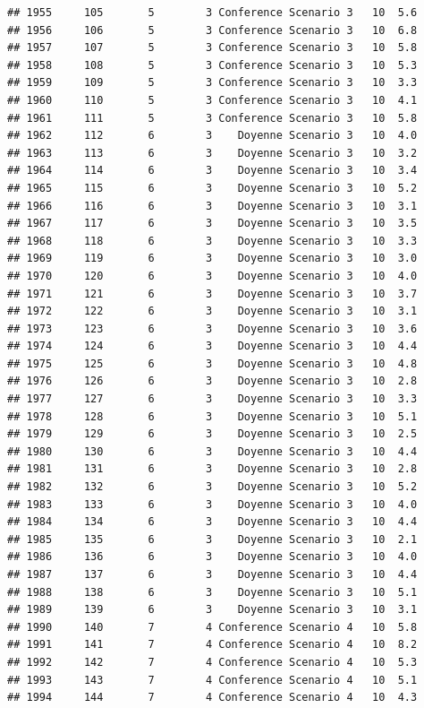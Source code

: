 \documentclass[
]{article}
\begin{document}
\begin{verbatim}
## 1955     105       5        3 Conference Scenario 3   10  5.6
## 1956     106       5        3 Conference Scenario 3   10  6.8
## 1957     107       5        3 Conference Scenario 3   10  5.8
## 1958     108       5        3 Conference Scenario 3   10  5.3
## 1959     109       5        3 Conference Scenario 3   10  3.3
## 1960     110       5        3 Conference Scenario 3   10  4.1
## 1961     111       5        3 Conference Scenario 3   10  5.8
## 1962     112       6        3    Doyenne Scenario 3   10  4.0
## 1963     113       6        3    Doyenne Scenario 3   10  3.2
## 1964     114       6        3    Doyenne Scenario 3   10  3.4
## 1965     115       6        3    Doyenne Scenario 3   10  5.2
## 1966     116       6        3    Doyenne Scenario 3   10  3.1
## 1967     117       6        3    Doyenne Scenario 3   10  3.5
## 1968     118       6        3    Doyenne Scenario 3   10  3.3
## 1969     119       6        3    Doyenne Scenario 3   10  3.0
## 1970     120       6        3    Doyenne Scenario 3   10  4.0
## 1971     121       6        3    Doyenne Scenario 3   10  3.7
## 1972     122       6        3    Doyenne Scenario 3   10  3.1
## 1973     123       6        3    Doyenne Scenario 3   10  3.6
## 1974     124       6        3    Doyenne Scenario 3   10  4.4
## 1975     125       6        3    Doyenne Scenario 3   10  4.8
## 1976     126       6        3    Doyenne Scenario 3   10  2.8
## 1977     127       6        3    Doyenne Scenario 3   10  3.3
## 1978     128       6        3    Doyenne Scenario 3   10  5.1
## 1979     129       6        3    Doyenne Scenario 3   10  2.5
## 1980     130       6        3    Doyenne Scenario 3   10  4.4
## 1981     131       6        3    Doyenne Scenario 3   10  2.8
## 1982     132       6        3    Doyenne Scenario 3   10  5.2
## 1983     133       6        3    Doyenne Scenario 3   10  4.0
## 1984     134       6        3    Doyenne Scenario 3   10  4.4
## 1985     135       6        3    Doyenne Scenario 3   10  2.1
## 1986     136       6        3    Doyenne Scenario 3   10  4.0
## 1987     137       6        3    Doyenne Scenario 3   10  4.4
## 1988     138       6        3    Doyenne Scenario 3   10  5.1
## 1989     139       6        3    Doyenne Scenario 3   10  3.1
## 1990     140       7        4 Conference Scenario 4   10  5.8
## 1991     141       7        4 Conference Scenario 4   10  8.2
## 1992     142       7        4 Conference Scenario 4   10  5.3
## 1993     143       7        4 Conference Scenario 4   10  5.1
## 1994     144       7        4 Conference Scenario 4   10  4.3

\end{verbatim}
\end{document}

